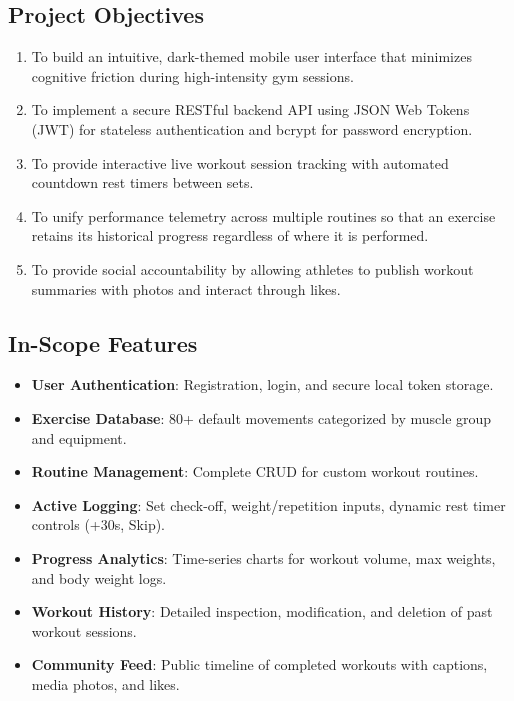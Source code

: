 \documentclass[12pt,a4paper]{article}
\begin{document}
\subsection{Project Objectives}
\begin{enumerate}[noitemsep]
    \item To build an intuitive, dark-themed mobile user interface that minimizes cognitive friction during high-intensity gym sessions.
    \item To implement a secure RESTful backend API using JSON Web Tokens (JWT) for stateless authentication and bcrypt for password encryption.
    \item To provide interactive live workout session tracking with automated countdown rest timers between sets.
    \item To unify performance telemetry across multiple routines so that an exercise retains its historical progress regardless of where it is performed.
    \item To provide social accountability by allowing athletes to publish workout summaries with photos and interact through likes.
\end{enumerate}

\subsection{In-Scope Features}
\begin{itemize}[noitemsep]
    \item \textbf{User Authentication}: Registration, login, and secure local token storage.
    \item \textbf{Exercise Database}: 80+ default movements categorized by muscle group and equipment.
    \item \textbf{Routine Management}: Complete CRUD for custom workout routines.
    \item \textbf{Active Logging}: Set check-off, weight/repetition inputs, dynamic rest timer controls (+30s, Skip).
    \item \textbf{Progress Analytics}: Time-series charts for workout volume, max weights, and body weight logs.
    \item \textbf{Workout History}: Detailed inspection, modification, and deletion of past workout sessions.
    \item \textbf{Community Feed}: Public timeline of completed workouts with captions, media photos, and likes.
\end{itemize}
\end{document}
